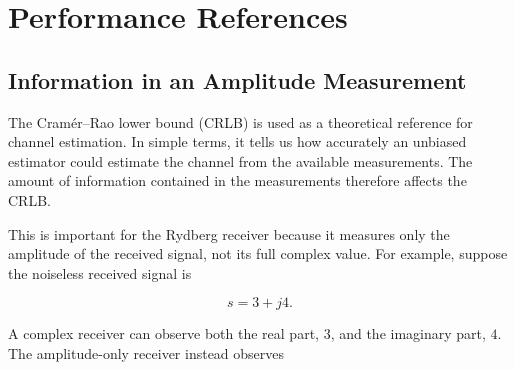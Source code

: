 \documentclass[journal]{IEEEtran}
\begin{document}
\begin{center}
\end{center}

\section{Performance References}
\label{sec:crlb}

\subsection{Information in an Amplitude Measurement}

The Cramér--Rao lower bound (CRLB) is used as a theoretical reference for
channel estimation. In simple terms, it tells us how accurately an
unbiased estimator could estimate the channel from the available
measurements. The amount of information contained in the measurements
therefore affects the CRLB.

This is important for the Rydberg receiver because it measures only the
amplitude of the received signal, not its full complex value. For example,
suppose the noiseless received signal is

\begin{equation}
s=3+j4.
\end{equation}

A complex receiver can observe both the real part, $3$, and
the imaginary part, $4$. The amplitude-only receiver instead observes
\end{document}

